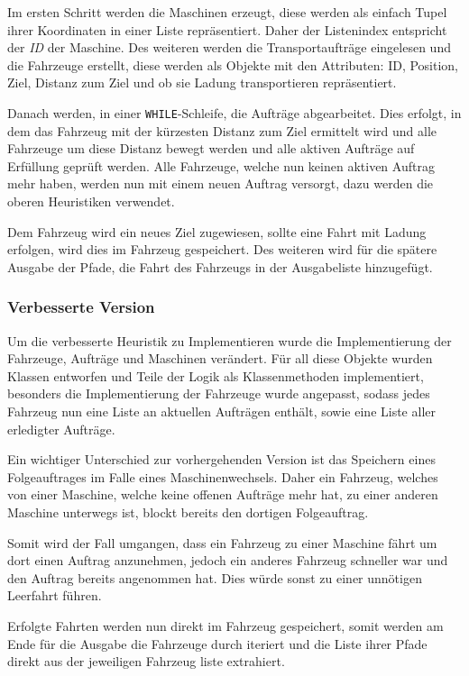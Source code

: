 \documentclass[ngerman]{tudscrreprt}
\newcommand{\code}[1]{\texttt{#1}}
\begin{document}
Im ersten Schritt werden die Maschinen erzeugt, diese werden als einfach Tupel ihrer Koordinaten
in einer Liste repräsentiert. Daher der Listenindex entspricht der \emph{ID} der Maschine.
Des weiteren werden die Transportaufträge eingelesen und die Fahrzeuge erstellt, diese werden als Objekte mit den Attributen: ID, Position, Ziel, Distanz zum Ziel und ob sie Ladung transportieren repräsentiert.

Danach werden, in einer \code{WHILE}-Schleife, die Aufträge abgearbeitet.
Dies erfolgt, in dem das Fahrzeug mit der kürzesten Distanz zum Ziel ermittelt wird und
alle Fahrzeuge um diese Distanz bewegt werden und alle aktiven Aufträge auf Erfüllung geprüft werden.
Alle Fahrzeuge, welche nun keinen aktiven Auftrag mehr haben, werden nun mit einem neuen
Auftrag versorgt, dazu werden die oberen Heuristiken verwendet.

Dem Fahrzeug wird ein neues Ziel zugewiesen, sollte eine Fahrt mit Ladung erfolgen,
wird dies im Fahrzeug gespeichert. Des weiteren wird für die spätere Ausgabe der Pfade,
die Fahrt des Fahrzeugs in der Ausgabeliste hinzugefügt.

\subsubsection{Verbesserte Version}
Um die verbesserte Heuristik zu Implementieren wurde die Implementierung der Fahrzeuge,
Aufträge und Maschinen verändert.
Für all diese Objekte wurden Klassen entworfen und Teile der Logik als Klassenmethoden
implementiert, besonders die Implementierung der Fahrzeuge wurde angepasst, sodass jedes
Fahrzeug nun eine Liste an aktuellen Aufträgen enthält, sowie eine Liste aller erledigter Aufträge.

Ein wichtiger Unterschied zur vorhergehenden Version ist das Speichern eines Folgeauftrages
im Falle eines Maschinenwechsels. Daher ein Fahrzeug, welches von einer Maschine, welche keine offenen Aufträge mehr hat, zu einer anderen Maschine unterwegs ist, blockt bereits den dortigen Folgeauftrag.

Somit wird der Fall umgangen, dass ein Fahrzeug zu einer Maschine fährt um dort einen Auftrag
anzunehmen, jedoch ein anderes Fahrzeug schneller war und den Auftrag bereits angenommen hat.
Dies würde sonst zu einer unnötigen Leerfahrt führen.

Erfolgte Fahrten werden nun direkt im Fahrzeug gespeichert, somit werden am Ende für die Ausgabe
die Fahrzeuge durch iteriert und die Liste ihrer Pfade direkt aus der jeweiligen Fahrzeug liste
extrahiert.
\end{document}
